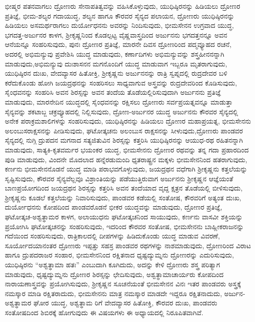 ಭೀಷ್ಮರ ಪತನವಾಗಲು ದ್ರೋಣರು ಸೇನಾಪತಿತ್ವವನ್ನು ವಹಿಸಿಕೊಳ್ಳುವುದು, ಯುಧಿಷ್ಠಿರನನ್ನು ಹಿಡಿಯಲು ದ್ರೋಣರ ಪ್ರತಿಜ್ಞೆ, ಭೀಮ-ಶಲ್ಯರ ಗದಾಯುದ್ಧ, ಶಲ್ಯನ ಹಾಗೂ ಕೌರವರ ಸೈನ್ಯದ ಪಲಾಯನ, ದ್ರೋಣರು ಯುಧಿಷ್ಠಿರನನ್ನು ಹಿಡಿಯಲು ಅಸಮರ್ಥರಾಗಲು ದುರ್ಯೋಧನನು ಅವರನ್ನು ನಿಂದಿಸುವುದು, ಭೀಮಸೇನನ ಉಗ್ರವಾದ ಯುದ್ಧ, ಭಗದತ್ತ-\-ಅರ್ಜುನರ ಕಾಳಗ, ಶ‍್ರೀಕೃಷ್ಣನಿಂದ ಕೊಡಲ್ಪಟ್ಟ ವೈಷ್ಣವಾಸ್ತ್ರದಿಂದ ಅರ್ಜುನನು ಭಗದತ್ತನನ್ನೂ ಅವನ ಆನೆಯನ್ನೂ ಸಂಹರಿಸುವುದು, ಪುನಃ ದ್ರೋಣರ ಪ್ರತಿಜ್ಞೆ, ಮಾರನೇ ದಿವಸ ದ್ರೋಣರಿಂದ ಪದ್ಮವ್ಯೂಹದ ರಚನೆ, ಅದರಲ್ಲಿ ಅಭಿಮನ್ಯುವು ಪ್ರವೇಶಿಸಿ ಯುದ್ಧ ಮಾಡುವುದು, ಕರ್ಣಾದಿಗಳು ಅಭಿಮನ್ಯುವನ್ನು ಶಸ್ತ್ರಹೀನನನ್ನಾಗಿ ಮಾಡುವುದು,\break ಅಭಿಮನ್ಯುವು ದುಃಶಾಸನನ ಮಗನೊಂದಿಗೆ ಯುದ್ಧ ಮಾಡುವಾಗ ಇಬ್ಬರೂ ಮೃತರಾಗುವುದು, ಯುಧಿಷ್ಠಿರನ ದುಃಖ, ವೇದವ್ಯಾಸರ ಹಿತೋಕ್ತಿ, ಶ‍್ರೀಕೃಷ್ಣನು ಅರ್ಜುನನನ್ನು ರಾತ್ರಿ ಸ್ವಪ್ನದಲ್ಲಿ ರುದ್ರದೇವರ ಬಳಿ ಕರೆದುಕೊಂಡು ಹೋಗಿ ಜಯದ್ರಥನನ್ನು ಸಂಹರಿಸಲು ಸಾಧ್ಯವಾಗುವ ಅಸ್ತ್ರವನ್ನು ರುದ್ರದೇವರಿಂದ ಕೊಡಿಸುವುದು, ಸೈಂಧವನನ್ನು ಸಂಹರಿಸಿ ಅವನ ಶಿರಸ್ಸನ್ನು ಅವನ ತಂದೆಯ ತೊಡೆಯಲ್ಲಿರಿಸುವುದಾಗಿ ಅರ್ಜುನನು ಪ್ರತಿಜ್ಞೆ ಮಾಡುವುದು, ಮಾರನೇದಿನ ಯುದ್ಧದಲ್ಲಿ ಸೈಂಧವನನ್ನು ರಕ್ಷಿಸಲು ದ್ರೋಣರು ಸರ್ವಪ್ರಯತ್ನವನ್ನೂ ಮಾಡುತ್ತಾ ಸೈನ್ಯವನ್ನು ಶಕಟಾಬ್ಜ ಚಕ್ರವ್ಯೂಹದಲ್ಲಿ ನಿಲ್ಲಿಸುವುದು, ದ್ರೋಣ-ಅರ್ಜುನರ ಯುದ್ಧ ಅರ್ಜುನನು ಕೌರವರ ಸೈನ್ಯದಲ್ಲಿ ಅನೇಕ ಪರಾಕ್ರಮಶಾಲಿಗಳನ್ನು ಸಂಹರಿಸುವುದು, ಯುಧಿಷ್ಠಿರನನ್ನು ಹಿಡಿಯಲು ದ್ರೋಣರ ಮಹಾಪ್ರಯತ್ನ, ಭೀಮಸೇನನು ಅಲಂಬುಸ\break ರಾಕ್ಷಸನನ್ನು ಪೀಡಿಸುವುದು, ಘಟೋತ್ಕಚನು ಅಲಂಬುಸ ರಾಕ್ಷಸನನ್ನು ಸೀಳುವುದು,\break ದ್ರೋಣರು ಪಾಂಡವರ ಸೈನ್ಯದಲ್ಲಿ ನುಗ್ಗಿ ದ್ರುಪದನ ಮಗನಾದ ಸತ್ಯಜಿತುವಿನ ಶಿರಸ್ಸನ್ನು ಕತ್ತರಿಸಿ ಯುಧಿಷ್ಠಿರನನ್ನು ಆಯುಧ-ರಥ ರಹಿತನನ್ನಾಗಿ ಮಾಡುವುದು, ಸಾತ್ಯಕಿ-ಕೃತವರ್ಮರ ಭಯಂಕರ ಯುದ್ಧ, ಭೀಮಸೇನನು ದ್ರೋಣರ ರಥವನ್ನು ತನ್ನ ಗದಾ ಪ್ರಹಾರದಿಂದ ಪುಡಿ ಮಾಡುವುದು, ವಿಂದನೇ ಮೊದಲಾದ ಹನ್ನೆರಡುಮಂದಿ ಧೃತರಾಷ್ಟ್ರನ ಮಕ್ಕಳು ಭೀಮಸೇನನಿಂದ ಹತರಾಗುವುದು, ಕರ್ಣನು ಭೀಮಸೇನನೊಡನೆ ಯುದ್ಧ ಮಾಡಿ ಪರಾಭವಗೊಳ್ಳುವುದು, ಜಯದ್ರಥನ ವಧೆಗಾಗಿ ಶ‍್ರೀಕೃಷ್ಣನು ಕತ್ತಲೆಯನ್ನು ಸೃಷ್ಟಿಸುವುದು, ಕೌರವರ ಸೈನ್ಯವೆಲ್ಲವೂ ವಿಶ್ರಾಂತಿಯನ್ನು ಪಡೆಯುತ್ತಿರುವಾಗ ಅರ್ಜುನನು ಶ‍್ರೀಕೃಷ್ಣನ ಆಜ್ಞೆಯಂತೆ ಬಾಣಪ್ರಯೋಗದಿಂದ ಜಯದ್ರಥನ ಶಿರಸ್ಸನ್ನು ಕತ್ತರಿಸಿ ಅವನ ತಂದೆಯಾದ ವೃದ್ದ ಕ್ಷತ್ರನ ತೊಡೆಯಲ್ಲಿ ಬೀಳಿಸುವುದು, ಶ‍್ರೀಕೃಷ್ಣನು ಕೂಡಲೆ ಕತ್ತಲೆಯನ್ನು ನಿವಾರಿಸುವುದು, ಪಾಂಡವರ ಕಡೆಯಲ್ಲಿ ಸಂತೋಷ, ಕೌರವರಿಗೆ ಅತ್ಯಂತ ದುಃಖ, ದುರ್ಯೋಧನನು ಕೋಪದಿಂದ ಪಾಂಡವರೊಡನೆ ಭೀಕರ ಯುದ್ಧವನ್ನು ಮಾಡುವುದು, ದ್ರೋಣರ ಪ್ರತಿಜ್ಞೆ, ಘಟೋತ್ಕಚ-\-ಅಶ್ವತ್ಥಾಮರ ಕಾಳಗ, ಅಲಾಯುಧನು ಘಟೋತ್ಕಚನಿಂದ ಸಾಯುವುದು, ಕರ್ಣನು ವಾಸವೀ ಶಕ್ತಿಯನ್ನು ಪ್ರಯೋಗಿಸಿ ಘಟೋತ್ಕಚನನ್ನು ಸಂಹರಿಸುವುದು, ಇದರಿಂದ ಕೌರವರ ಸಂತೋಷ, ಭೀಮಸೇನನು ಬಾಹ್ಲೀಕರಾಜನನ್ನು ಗದೆಯಿಂದ ಸಂಹರಿಸುವುದು, ರಾತ್ರಿಕಾಲದಲ್ಲಿ ದೀಪಗಳನ್ನು ಹಿಡಿದುಕೊಂಡು ಯುದ್ಧ ಮಾಡುವ ವಿವರಣೆ, ಸೂರ್ಯೋದಯಾನಂತರ ದ್ರೋಣರು ಇಪ್ಪತ್ತು ಸಹಸ್ರ ಪಾಂಡವರ ರಥಗಳನ್ನು ನಾಶಮಾಡುವುದು, ದ್ರೋಣರಿಂದ ವಿರಾಟ ಹಾಗೂ ದ್ರುಪದರಾಜರ ಸಂಹಾರ, ಭೀಮಸೇನನಿಂದ ರಕ್ಷಿತನಾದ ಧೃಷ್ಟದ್ಯುಮ್ನನು ದ್ರೋಣರನ್ನು ಎದುರಿಸುವುದು, ಯುಧಿಷ್ಠಿರನು “ಅಶ್ವತ್ಥಾಮಾ ಹತಃ” ಎಂಬುದಾಗಿ ಕೂಗಿದುದು, ಅದನ್ನು ಕೇಳಿ ದ್ರೋಣರು ಶಸ್ತ್ರ ಪರಿತ್ಯಾಗ ಮಾಡುವುದು, ಧೃಷ್ಟದ್ಯುಮ್ನನು ದ್ರೋಣರ ಶಿರಸ್ಸನ್ನು ಛೇದಿಸುವುದು, ಅಶ್ವತ್ಥಾಮಾಚಾರ್ಯರು ಕೋಪದಿಂದ ನಾರಾಯಣಾಸ್ತ್ರವನ್ನು ಪ್ರಯೋಗಿಸುವುದು, ಶ‍್ರೀಕೃಷ್ಣನ ಸೂಚನೆಯಂತೆ ಭೀಮಸೇನನ ವಿನಃ ಇತರ ಪಾಂಡವರು ಅಸ್ತ್ರಕ್ಕೆ ನಮಸ್ಕಾರ ಮಾಡಿ ರಕ್ಷಿತರಾದುದು, ಭೀಮಸೇನನು ಮಾತ್ರ ನಮಸ್ಕಾರ ಮಾಡದೇ ಇದ್ದರೂ ರಕ್ಷಿತನಾದುದು, ಅರ್ಜುನ-ಅಶ್ವತ್ಥಾಮರ ಘೋರ ಯುದ್ಧ, ಅಶ್ವತ್ಥಾಮ ರಿಗೆ ವೇದವ್ಯಾಸರ ಹಿತೋಕ್ತಿ, ಕೌರವರ ದುಃಖ, ಪಾಂಡವರು ಸಂತೋಷದಿಂದ ಶಿಬಿರಕ್ಕೆ ಹೋಗುವುದು ಈ ವಿಷಯಗಳು ಈ ಅಧ್ಯಾಯದಲ್ಲಿ ನಿರೂಪಿತವಾಗಿವೆ.


